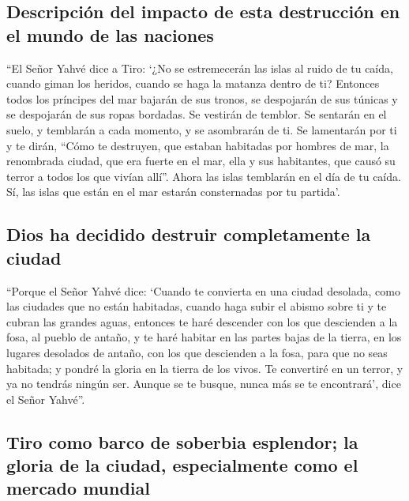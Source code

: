\hypertarget{descripciuxf3n-del-impacto-de-esta-destrucciuxf3n-en-el-mundo-de-las-naciones}{%
\subsection{Descripción del impacto de esta destrucción en el mundo de
las
naciones}\label{descripciuxf3n-del-impacto-de-esta-destrucciuxf3n-en-el-mundo-de-las-naciones}}

 ``El Señor Yahvé dice a Tiro: `¿No se estremecerán las
islas al ruido de tu caída, cuando giman los heridos, cuando se haga la
matanza dentro de ti?  Entonces todos los príncipes del
mar bajarán de sus tronos, se despojarán de sus túnicas y se despojarán
de sus ropas bordadas. Se vestirán de temblor. Se sentarán en el suelo,
y temblarán a cada momento, y se asombrarán de ti.  Se
lamentarán por ti y te dirán, ``Cómo te destruyen, que estaban habitadas
por hombres de mar, la renombrada ciudad, que era fuerte en el mar, ella
y sus habitantes, que causó su terror a todos los que vivían allí''.
 Ahora las islas temblarán en el día de tu caída. Sí, las
islas que están en el mar estarán consternadas por tu partida'.

\hypertarget{dios-ha-decidido-destruir-completamente-la-ciudad}{%
\subsection{Dios ha decidido destruir completamente la
ciudad}\label{dios-ha-decidido-destruir-completamente-la-ciudad}}

 ``Porque el Señor Yahvé dice: `Cuando te convierta en
una ciudad desolada, como las ciudades que no están habitadas, cuando
haga subir el abismo sobre ti y te cubran las grandes aguas,
 entonces te haré descender con los que descienden a la
fosa, al pueblo de antaño, y te haré habitar en las partes bajas de la
tierra, en los lugares desolados de antaño, con los que descienden a la
fosa, para que no seas habitada; y pondré la gloria en la tierra de los
vivos.  Te convertiré en un terror, y ya no tendrás
ningún ser. Aunque se te busque, nunca más se te encontrará', dice el
Señor Yahvé''.

\hypertarget{tiro-como-barco-de-soberbia-esplendor-la-gloria-de-la-ciudad-especialmente-como-el-mercado-mundial}{%
\subsection{Tiro como barco de soberbia esplendor; la gloria de la
ciudad, especialmente como el mercado
mundial}\label{tiro-como-barco-de-soberbia-esplendor-la-gloria-de-la-ciudad-especialmente-como-el-mercado-mundial}}

